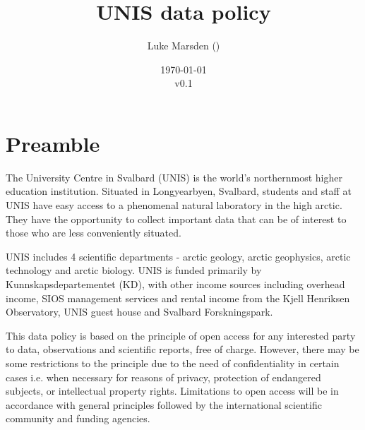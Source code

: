 \documentclass[a4paper,english, 11pt]{article}
\title{UNIS data policy}
\date{\today\\v0.1}
\author{Luke Marsden (\emailme)}
\begin{document}
\maketitle
\tableofcontents

\newpage

\section{Preamble}
\label{s:preamble}

The University Centre in Svalbard (UNIS) is the world's northernmost higher education institution. Situated in Longyearbyen, Svalbard, students and staff at UNIS have easy access to a phenomenal natural laboratory in the high arctic. They have the opportunity to collect important data that can be of interest to those who are less conveniently situated.

UNIS includes 4 scientific departments - arctic geology, arctic geophysics, arctic technology and arctic biology. UNIS is funded primarily by Kunnskapsdepartementet (KD), with other income sources including overhead income, SIOS management services and rental income from the Kjell Henriksen Observatory, UNIS guest house and Svalbard Forskningspark.

This data policy is based on the principle of open access for any interested party to data, observations and scientific reports, free of charge. However, there may be some restrictions to
the principle due to the need of confidentiality in certain cases i.e. when necessary for reasons
of privacy, protection of endangered subjects, or intellectual property rights. Limitations to open
access will be in accordance with general principles followed by the international scientific
community and funding agencies.    
\end{document}
